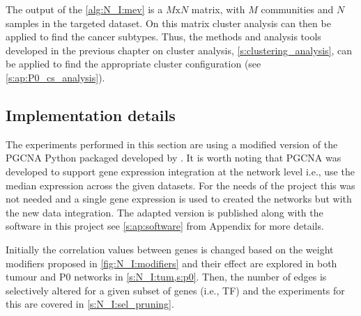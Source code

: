 The output of the \cref{alg:N_I:mev} is a $M\text{x}N$ matrix, with $M$ communities and $N$ samples in the targeted dataset. On this matrix cluster analysis can then be applied to find the cancer subtypes. Thus, the methods and analysis tools developed in the previous chapter on cluster analysis, \cref{s:clustering_analysis}, can be applied to find the appropriate cluster configuration (see \cref{s:ap:P0_cs_analysis}).


\subsection{Implementation details} \label{s:N_I:implementation}

The experiments performed in this section are using a modified version of the PGCNA Python packaged developed by \citet{Care2019-ij}. It is worth noting that PGCNA was developed to support gene expression integration at the network level i.e., use the median expression across the given datasets. For the needs of the project this was not needed and a single gene expression is used to created the networks but with the new data integration. The adapted version is published along with the software in this project see \cref{s:ap:software} from Appendix for more details.

Initially the correlation values between genes is changed based on the weight modifiers proposed in \cref{fig:N_I:modifiers} and their effect are explored in both tumour and P0 networks in \cref{s:N_I:tum,s:p0}. Then, the number of edges is selectively altered for a given subset of genes (i.e., TF) and the experiments for this are covered in \cref{s:N_I:sel_pruning}. 





